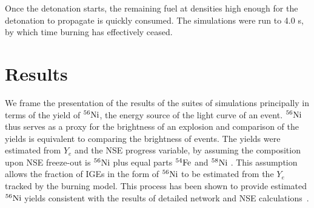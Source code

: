 \documentclass[preprint2]{aastex63}
\newcommand{\Ni}[1]{\ensuremath{{}^{#1}{\rm Ni}}}
\newcommand{\Fe}[1]{\ensuremath{{}^{#1}{\rm Fe}}}
\begin{document}
Once the detonation starts, the remaining fuel at densities
high enough for the detonation to propagate is quickly consumed.
The simulations were run to 4.0 s, by which time burning
has effectively ceased.


\section{Results}

We frame the presentation of the results of the suites of simulations
principally in terms of the yield of \Ni{56}, the energy source of
the light curve of an event. \Ni{56} thus serves as a proxy
for the brightness of an explosion and comparison of the yields
is equivalent to comparing the brightness of events. The
yields were estimated from $Y_e$ and the NSE progress variable, by 
assuming the composition upon NSE freeze-out is \Ni{56} plus equal
parts \Fe{54} and \Ni{58} \citep{townetal2009,Meaketal09}.
This assumption allows the fraction of IGEs in the form of \Ni{56} to be 
estimated from the $Y_e$ tracked by the burning model. 
{\color{blue}
This process has been shown to provide estimated \Ni{56} yields consistent with
the results of detailed network and NSE calculations~\citep{townetal2016,caldertownsley2018}.
}
\end{document}
